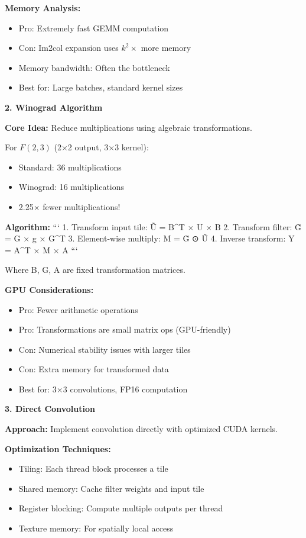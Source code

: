 \documentclass[12pt]{article}
\newcommand{\explanation}[1]{{\color{explanationcolor}#1}}
\begin{document}
\begin{enumerate}[(a)]
{{    \textbf{Memory Analysis:}
    \begin{itemize}
        \item Pro: Extremely fast GEMM computation
        \item Con: Im2col expansion uses $k^2×$ more memory
        \item Memory bandwidth: Often the bottleneck
        \item Best for: Large batches, standard kernel sizes
    \end{itemize}
    }
    
    \textbf{2. Winograd Algorithm}
    
    \explanation{
    \textbf{Core Idea:}
    Reduce multiplications using algebraic transformations.
    
    For $F(2,3)$ (2×2 output, 3×3 kernel):
    \begin{itemize}
        \item Standard: 36 multiplications
        \item Winograd: 16 multiplications
        \item 2.25× fewer multiplications!
    \end{itemize}
    
    \textbf{Algorithm:}
    ```
    1. Transform input tile: Ũ = B^T × U × B
    2. Transform filter: G̃ = G × g × G^T
    3. Element-wise multiply: M = G̃ ⊙ Ũ
    4. Inverse transform: Y = A^T × M × A
    ```
    
    Where B, G, A are fixed transformation matrices.
    
    \textbf{GPU Considerations:}
    \begin{itemize}
        \item Pro: Fewer arithmetic operations
        \item Pro: Transformations are small matrix ops (GPU-friendly)
        \item Con: Numerical stability issues with larger tiles
        \item Con: Extra memory for transformed data
        \item Best for: 3×3 convolutions, FP16 computation
    \end{itemize}
    }
    
    \textbf{3. Direct Convolution}
    
    \explanation{
    \textbf{Approach:}
    Implement convolution directly with optimized CUDA kernels.
    
    \textbf{Optimization Techniques:}
    \begin{itemize}
        \item Tiling: Each thread block processes a tile
        \item Shared memory: Cache filter weights and input tile
        \item Register blocking: Compute multiple outputs per thread
        \item Texture memory: For spatially local access
    \end{itemize}
    
}}
\end{enumerate}
\end{document}
